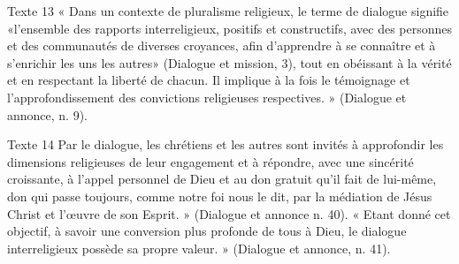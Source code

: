Texte  13 «  Dans  un  contexte  de  pluralisme  religieux,  le  terme  de  dialogue  signifie  «l’ensemble  des rapports  interreligieux,  positifs  et  constructifs,  avec  des  personnes  et  des  communautés  de diverses  croyances,  afin  d’apprendre  à  se  connaître  et  à  s’enrichir  les  uns  les  autres» (Dialogue  et  mission,  3),  tout  en  obéissant  à  la  vérité  et  en  respectant  la  liberté  de  chacun.  Il implique  à  la  fois  le  témoignage  et  l’approfondissement  des  convictions  religieuses respectives.  »  (Dialogue  et  annonce, n. 9). 


Texte  14 Par  le  dialogue,  les  chrétiens  et  les  autres  sont  invités  à  approfondir  les  dimensions  religieuses de  leur  engagement  et  à  répondre,  avec  une  sincérité  croissante,  à  l’appel  personnel  de  Dieu  et au  don  gratuit  qu’il  fait  de  lui-même,  don  qui  passe  toujours,  comme  notre  foi  nous  le  dit,  par la  médiation  de  Jésus  Christ  et  l’œuvre  de  son  Esprit.  »  (Dialogue  et  annonce  n.  40).  «  Etant donné  cet  objectif,  à  savoir  une  conversion  plus  profonde  de  tous  à  Dieu,  le  dialogue interreligieux possède  sa  propre  valeur.  »  (Dialogue  et  annonce,  n. 41). 